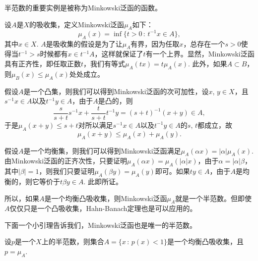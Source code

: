 
\begin{para}[Minkowski泛函]
半范数的重要实例是被称为Minkowski泛函的函数。

设$A$是$X$的吸收集，定义Minkowski泛函$\mu_A$如下：
\[
	\mu_A(x)=\inf\{t>0\,:\,t^{-1}x\in A\},
\]
其中$x\in X$. $A$是吸收集的假设是为了让$\mu_A$有界，因为任取$x$，总存在一个$s>0$使得当$t^{-1}>s$时候都有$x\in t^{-1}A$，这样就保证了$t$有一个上界。显然，Minkowski泛函具有正齐性，即任取正数$t$，我们有等式$\mu_A(tx)=t\mu_A(x)$. 此外，如果$A\subset B$，则$\mu_B(x)\leq \mu_A(x)$处处成立。

假设$A$是一个凸集，则我们可以得到Minkowski泛函的次可加性，设$x$, $y\in X$，且$s^{-1}x\in A$以及$t^{-1}y\in A$，由于$A$是凸的，则
\[
	\frac{s}{s+t}s^{-1}x+\frac{t}{s+t}t^{-1}y=(s+t)^{-1}(x+y)\in A,
\]
于是$\mu_A(x+y)\leq s+t$对所以满足$s^{-1}x\in A$以及$t^{-1}y\in A$的$s$, $t$都成立，故
\[
	\mu_A(x+y)\leq \mu_A(x)+\mu_A(y).
\]

假设$A$是一个均衡集，则我们可以得到Minkowski泛函满足$\mu_A(\alpha x)=|\alpha|\mu_A(x)$. 由Minkowski泛函的正齐次性，只要证明$\mu_A(\alpha x)=\mu_A(|\alpha| x)$，由于$\alpha=|\alpha|\beta$，其中$|\beta|=1$，则我们只要证明$\mu_A(\beta y)=\mu_A(y)$即可。如果$ty\in A$，由于$A$是均衡的，则它等价于$t\beta y\in A$. 此即所证。

所以，如果$A$是一个均衡凸吸收集，则Minkowski泛函$\mu_A$就是一个半范数。但即使$A$仅仅只是一个凸吸收集，Hahn-Banach定理也是可以应用的。
\end{para}

下面一个小引理告诉我们，Minkowski泛函也是唯一的半范数。

\begin{lem}\label{1.54}
设$p$是一个$X$上的半范数，则集合$A=\{x\,:\, p(x)<1\}$是一个均衡凸吸收集，且$p=\mu_A$.
\end{lem}

